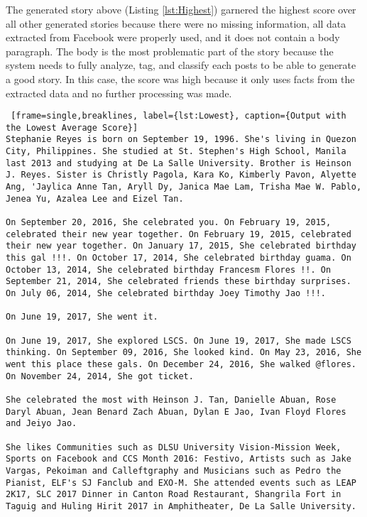 The generated story above (Listing \ref{lst:Highest}) garnered the highest score over all other generated stories because there were no missing information, all data extracted from Facebook were properly used, and it does not contain a body paragraph. The body is the most problematic part of the story because the system needs to fully analyze, tag, and classify each posts to be able to generate a good story. In this case, the score was high because it only uses facts from the extracted data and no further processing was made. 

\begin{lstlisting} [frame=single,breaklines, label={lst:Lowest}, caption={Output with the Lowest Average Score}]
Stephanie Reyes is born on September 19, 1996. She's living in Quezon City, Philippines. She studied at St. Stephen's High School, Manila last 2013 and studying at De La Salle University. Brother is Heinson J. Reyes. Sister is Christly Pagola, Kara Ko, Kimberly Pavon, Alyette Ang, 'Jaylica Anne Tan, Aryll Dy, Janica Mae Lam, Trisha Mae W. Pablo, Jenea Yu, Azalea Lee and Eizel Tan.

On September 20, 2016, She celebrated you. On February 19, 2015, celebrated their new year together. On February 19, 2015, celebrated their new year together. On January 17, 2015, She celebrated birthday this gal !!!. On October 17, 2014, She celebrated birthday guama. On October 13, 2014, She celebrated birthday Francesm Flores !!. On September 21, 2014, She celebrated friends these birthday surprises. On July 06, 2014, She celebrated birthday Joey Timothy Jao !!!.

On June 19, 2017, She went it.

On June 19, 2017, She explored LSCS. On June 19, 2017, She made LSCS thinking. On September 09, 2016, She looked kind. On May 23, 2016, She went this place these gals. On December 24, 2016, She walked @flores. On November 24, 2014, She got ticket.

She celebrated the most with Heinson J. Tan, Danielle Abuan, Rose Daryl Abuan, Jean Benard Zach Abuan, Dylan E Jao, Ivan Floyd Flores and Jeiyo Jao.

She likes Communities such as DLSU University Vision-Mission Week, Sports on Facebook and CCS Month 2016: Festivo, Artists such as Jake Vargas, Pekoiman and Calleftgraphy and Musicians such as Pedro the Pianist, ELF's SJ Fanclub and EXO-M. She attended events such as LEAP 2K17, SLC 2017 Dinner in Canton Road Restaurant, Shangrila Fort in Taguig and Huling Hirit 2017 in Amphitheater, De La Salle University.
\end{lstlisting}

